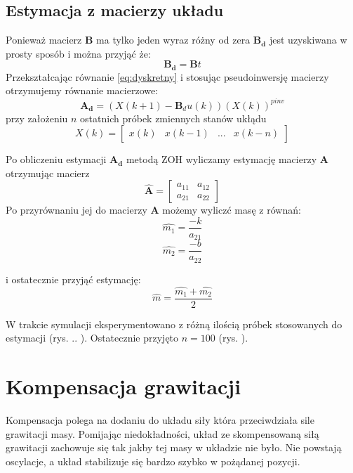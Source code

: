 \documentclass[a4paper]{article}
\begin{document}
\subsection{Estymacja z macierzy układu}
Ponieważ macierz $\mathbf{B}$ ma tylko jeden wyraz różny od zera $\mathbf{B_d}$ jest uzyskiwana w prosty sposób i można przyjąć że:
\begin{equation}
\mathbf{B_d} = \mathbf{B}t
\end{equation} 
Przekształcając równanie \ref{eq:dyskretny} i stosując pseudoinwersję macierzy otrzymujemy równanie macierzowe:
\begin{equation}
	\mathbf{A_d} = (X(k+1) - \mathbf{B}_du(k))(X(k))^{pinv}
	\label{eq:pinv}
\end{equation}
przy założeniu $n$ ostatnich próbek zmiennych stanów ukłądu
\begin{equation}
	X(k) = 	\begin{bmatrix}
		    x(k) & x(k-1)  & ... & x(k-n) 
		\end{bmatrix}
	\label{eq:xk}
\end{equation}

Po obliczeniu estymacji $\mathbf{A_d}$ metodą ZOH wyliczamy estymację macierzy $\mathbf{A}$ otrzymując macierz
\begin{equation}
\mathbf{\hat{A}} = 	\begin{bmatrix}
	    a_{11} & a_{12}\\
	    a_{21} & a_{22}
	\end{bmatrix}
\end{equation} 
Po przyrównaniu jej do macierzy $\mathbf{A}$ możemy wyliczć masę z równań:
\begin{equation}
\hat{m_1} = \frac{-k}{a_{21}}
\end{equation}
\begin{equation}
\hat{m_2} = \frac{-b}{a_{22}}
\end{equation}

i ostatecznie przyjąć estymację:
\begin{equation}
\hat{m} = \frac{\hat{m_1}+\hat{m_2}}{2}
\end{equation}


W trakcie symulacji eksperymentowano z różną ilością próbek stosowanych do estymacji (rys. .. ). Ostatecznie przyjęto $n = 100$ (rys. ).

\section{Kompensacja grawitacji}
Kompensacja polega na dodaniu do układu siły która przeciwdziała sile grawitacji masy. Pomijając niedokładności, układ ze skompensowaną siłą grawitacji zachowuje się tak jakby tej masy w układzie nie było. Nie powstają oscylacje, a układ stabilizuje się bardzo szybko w pożądanej pozycji.
\end{document}
